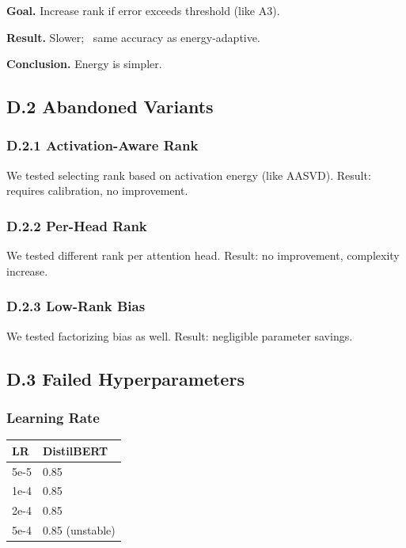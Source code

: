 \textbf{Goal.} Increase rank if error exceeds threshold (like A3).

\textbf{Result.} Slower; ~same accuracy as energy-adaptive.

\textbf{Conclusion.} Energy is simpler.

\subsection{D.2 Abandoned Variants}

\subsubsection{D.2.1 Activation-Aware Rank}

We tested selecting rank based on activation energy (like AASVD). Result: 
requires calibration, no improvement.

\subsubsection{D.2.2 Per-Head Rank}

We tested different rank per attention head. Result: no improvement, 
complexity increase.

\subsubsection{D.2.3 Low-Rank Bias}

We tested factorizing bias as well. Result: negligible parameter savings.

\subsection{D.3 Failed Hyperparameters}

\subsubsection{Learning Rate}

\begin{table}[H]
\centering
\small
\begin{tabular}{ll}
\toprule
\textbf{LR} & \textbf{DistilBERT} \\
\midrule
5e-5 & 0.85 \\
1e-4 & 0.85 \\
2e-4 & 0.85 \\
5e-4 & 0.85 (unstable) \\
\bottomrule
\end{tabular}
\end{table}

